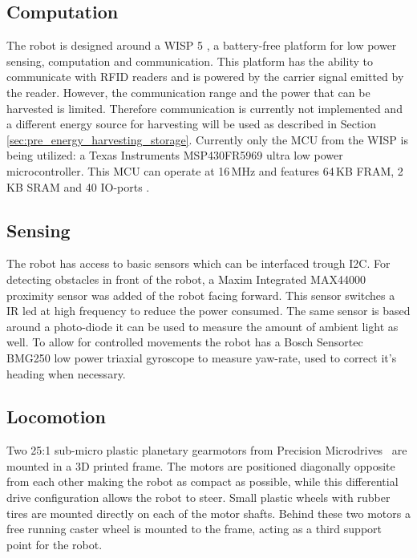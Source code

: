 \subsection{Computation}
\label{sec:dai_computation}

The robot is designed around a WISP 5 \cite{wisp5_wiki_2017}, a battery-free platform for low power sensing, computation and communication.
This platform has the ability to communicate with RFID readers and is powered by the carrier signal emitted by the reader.
However, the communication range and the power that can be harvested is limited.
Therefore communication is currently not implemented and a different energy source for harvesting will be used as described in Section \ref{sec:pre_energy_harvesting_storage}.
Currently only the MCU from the WISP is being utilized: a Texas Instruments MSP430FR5969 ultra low power microcontroller.
This MCU can operate at 16\,MHz and features 64\,KB FRAM, 2\,KB SRAM and 40 IO-ports \cite{msp430fr5969_2017}.

\subsection{Sensing}
\label{sec:dai_sensing}

The robot has access to basic sensors which can be interfaced trough I2C.
For detecting obstacles in front of the robot, a Maxim Integrated MAX44000 proximity sensor was added of the robot facing forward.
This sensor switches a IR led at high frequency to reduce the power consumed.
The same sensor is based around a photo-diode it can be used to measure the amount of ambient light as well.
To allow for controlled movements the robot has a Bosch Sensortec BMG250 low power triaxial gyroscope to measure yaw-rate, used to correct it's heading when necessary.

\subsection{Locomotion}

Two 25:1 sub-micro plastic planetary gearmotors from Precision Microdrives~\cite{gearmotor_206-110_2017} are mounted in a 3D printed frame.
The motors are positioned diagonally opposite from each other making the robot as compact as possible, while this differential drive configuration allows the robot to steer.
Small plastic wheels with rubber tires are mounted directly on each of the motor shafts.
Behind these two motors a free running caster wheel is mounted to the frame, acting as a third support point for the robot.

